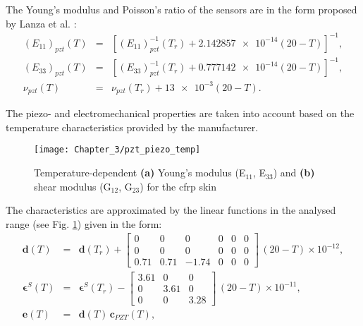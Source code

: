 The Young's modulus and Poisson's ratio of the sensors are in the form proposed by Lanza et al. \cite{lanza2008temperature}:
\begin{eqnarray}
	\left(E_{11}\right)_{pzt}(T) & = & \left[\left(E_{11}\right)^{-1}_{pzt}(T_r) + \num{2.142857e-14}(20-T)\right]^{-1},\\
	\left(E_{33}\right)_{pzt}(T) & = & \left[\left(E_{33}\right)^{-1}_{pzt}(T_r) + \num{0.777142e-14}(20-T)\right]^{-1},\\
	\nu_{pzt}(T) & = & \nu_{pzt}(T_r) + \num{13e-3}(20-T).
	\label{eq:pzt_temp}
\end{eqnarray}

The piezo- and electromechanical properties are taken into account based on the
temperature characteristics provided by the manufacturer.
\begin{figure}
	\begin{center}
		\texttt{[image: Chapter\_3/pzt\_piezo\_temp]}
	\end{center}
	\caption{Temperature-dependent \textbf{(a)} Young's modulus (E\(_{11}\), E\(_{33}\)) and \textbf{(b)} shear modulus (G\(_{12}\), G\(_{23}\)) for the \acf{cfrp} skin}
	\label{fig:pzt_temp}
\end{figure}
The characteristics are approximated by the linear functions  in the analysed range (see Fig. \ref{fig:pzt_temp}) given in the form:
\begin{eqnarray}
	\textbf{d}(T) & = & \boldsymbol{d}(T_r) + \left[
	\begin{array}{cccccc}
		0 & 0 & 0 & 0 & 0 & 0\\
		0 & 0 & 0 & 0 & 0 & 0\\
		0.71 & 0.71 & -1.74 & 0 & 0 & 0
	\end{array}\right]\,(20-T) \times10^{-12},\\
	\boldsymbol{\epsilon}^S(T) & = & \boldsymbol{\epsilon}^S(T_r) - \left[
	\begin{array}{ccc}
		3.61 & 0 & 0\\
		0 & 3.61 & 0\\
		0 & 0 & 3.28
	\end{array}\right]\,(20-T) \times10^{-11},\\
	\textbf{e}(T) & = & \textbf{d}(T)\,\textbf{c}_{PZT}(T),
	\label{eq:piezo_temp}
\end{eqnarray}
%
%
